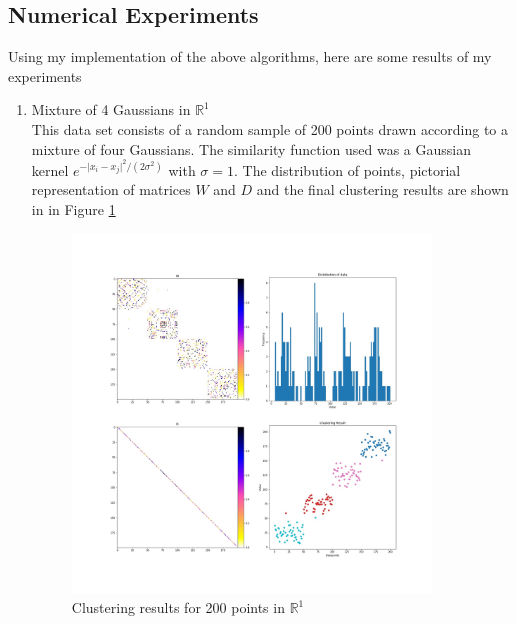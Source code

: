 \documentclass[10pt,a4paper, nocenter]{report}
\newcommand{\abs}[1]{\lvert {#1} \rvert}
\begin{document}
    \subsection{Numerical Experiments}

    Using my implementation of the above algorithms, here are some results of my experiments

    \begin{enumerate}
        \item{Mixture of 4 Gaussians in $\mathbb{R}^1$}\\
        This data set consists of a random sample of 200 points drawn according to a mixture of four Gaussians. The similarity function used was a Gaussian kernel $e^{-\abs{x_i - x_j}^2/(2\sigma^2)}$ with $\sigma = 1$. The distribution of points, pictorial representation of matrices $W$ and $D$ and the final clustering results are shown in in Figure \ref{fig:1dresults}

        \begin{figure}[h]
        \includegraphics[width=0.9\textwidth]{../../1DCluster.jpg}
        \caption{Clustering results for 200 points in $\mathbb{R}^1$}
        \label{fig:1dresults}
        \end{figure}


\end{enumerate}
\end{document}
